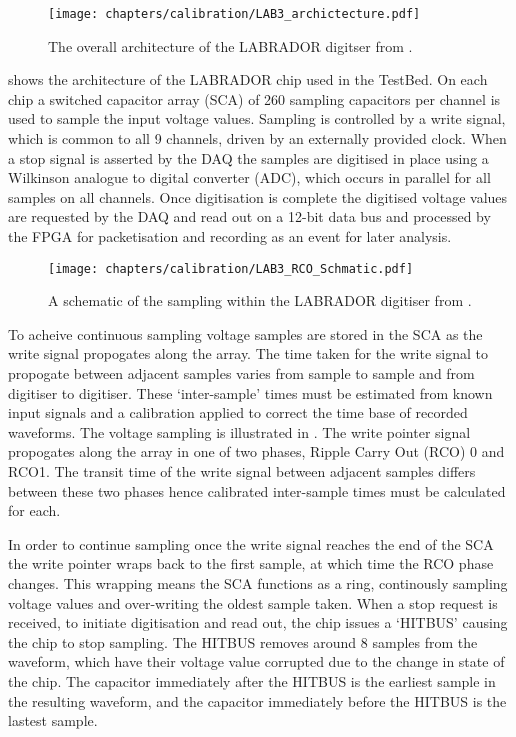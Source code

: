 \begin{figure}[htpb]
  \texttt{[image: chapters/calibration/LAB3\_archictecture.pdf]}
  \caption{The overall architecture of the LABRADOR digitser from \cite{Varner2007447}.}
  \label{fig:calibration:LABRADOR-Digitiser-Chip:Architecture}
\end{figure}

 shows the architecture of the LABRADOR chip used in the TestBed. On each chip a switched capacitor array (SCA) of 260 sampling capacitors per channel is used to sample the input voltage values. Sampling is controlled by a write signal, which is common to all 9 channels, driven by an externally provided clock. When a stop signal is asserted by the DAQ the samples are digitised in place using a Wilkinson analogue to digital converter (ADC), which occurs in parallel for all samples on all channels. Once digitisation is complete the digitised voltage values are requested by the DAQ and read out on a 12-bit data bus and processed by the FPGA for packetisation and recording as an event for later analysis.

\begin{figure}[htpb]
  \texttt{[image: chapters/calibration/LAB3\_RCO\_Schmatic.pdf]}
  \caption{A schematic of the sampling within the LABRADOR digitiser from \cite{Varner2007447}.}
  \label{fig:calibration:LABRADOR-Digitiser-Chip:Schematic}
\end{figure}


To acheive continuous sampling voltage samples are stored in the SCA as the write signal propogates along the array. The time taken for the write signal to propogate between adjacent samples varies from sample to sample and from digitiser to digitiser. These `inter-sample' times must be estimated from known input signals and a calibration applied to correct the time base of recorded waveforms. The voltage sampling is illustrated in . The write pointer signal propogates along the array in one of two phases, Ripple Carry Out (RCO) 0 and RCO1. The transit time of the write signal between adjacent samples differs between these two phases hence calibrated inter-sample times must be calculated for each.

In order to continue sampling once the write signal reaches the end of the SCA the write pointer wraps back to the first sample, at which time the RCO phase changes. This wrapping means the SCA functions as a ring, continously sampling voltage values and over-writing the oldest sample taken. When a stop request is received, to initiate digitisation and read out, the chip issues a `HITBUS' causing the chip to stop sampling. The HITBUS removes around 8 samples from the waveform, which have their voltage value corrupted due to the change in state of the chip. The capacitor immediately after the HITBUS is the earliest sample in the resulting waveform, and the capacitor immediately before the HITBUS is the lastest sample. 

